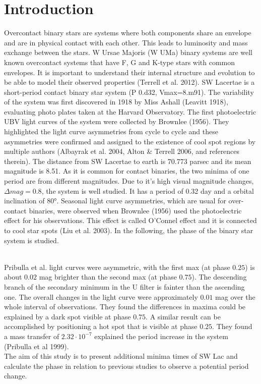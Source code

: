 \section{Introduction}
\label{sec:Theorie}

Overcontact binary stars are systems where both components share an envelope and 
are in physical contact with each other. This leads to luminosity and mass exchange 
between the stars. W Ursae Majoris (W UMa) binary systems are well known overcontact 
systems that have F, G and K-type stars with common envelopes. It is important to 
understand their internal structure and evolution to be able to model their observed 
properties (Terrell et al. 2012). SW Lacertae is a short-period contact binary star 
system (P 0.d32, Vmax=8.m91). The variability of the system was first discovered in 
1918 by Miss Ashall (Leavitt 1918), evaluating photo plates taken at the Harvard Observatory. 
The first photoelectric 
UBV light curves of the system were collected by Brownlee (1956). They highlighted the 
light curve asymmetries from cycle to cycle and these asymmetries were confirmed and 
assigned to the existence of cool spot regions by multiple authors (Albayrak et al. 
2004, Alton \& Terrell 2006, and references therein). The distance from SW Lacertae to 
earth is 70.773 parsec and its mean magnitude is 8.51. As it is common for contact 
binaries, the two minima of one period are from different magnitudes. Due to it’s 
high visual magnitude changes, $\Delta mag = 0.8$, the system is well studied. It has a 
period of 0.32 day and a orbital inclination of 80°. Seasonal light curve asymmetries,
 which are usual for over-contact binaries, were observed when Brownlee (1956) used the
  photoelectric effect for his observations. This effect is called O’Connel effect and 
  it is connected to cool star spots (Liu et al. 2003). 
In the following, the phase of the binary star system is studied.   

\\\noindent Pribulla et al. light curves were asymmetric, with the first max (at phase $0.25$) is about 
$0.02$ mag brighter than the second max (at phase $0.75$). The descending branch of the 
secondary minimum in the U filter is fainter than the ascending one. The overall changes 
in the light curve were approximately $0.01$ mag over the whole interval of observations. 
They found the differences in maxima could be explained by a dark spot visible at phase $0.75$.
 A similar result can be accomplished by positioning a hot spot that is visible at phase $0.25$.
  They found a mass transfer of $2.32 \cdot 10^{-7}$ explained the period increase in the system 
  (Pribulla et al 1999).\\

\noindent The aim of this study is to present additional minima times of SW Lac and calculate the phase in 
relation to previous studies to observe a potential period change. 
